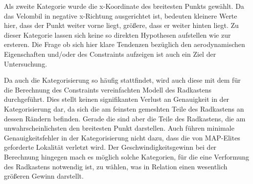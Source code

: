 Als zweite Kategorie wurde die x-Koordinate des breitesten Punkts gewählt.
Da das Velombil in negative x-Richtung ausgerichtet ist, bedeuten kleinere Werte hier, dass der Punkt weiter vorne liegt, größere, dass er weiter hinten liegt.
Zu dieser Kategorie lassen sich keine so direkten Hypothesen aufstellen wie zur ersteren.
Die Frage ob sich hier klare Tendenzen bezüglich den aerodynamischen Eigenschaften und/oder des Constraints aufzeigen ist auch ein Ziel der Untersuchung.

Da auch die Kategorisierung so häufig stattfindet, wird auch diese mit dem für die Berechnung des Constraints vereinfachten Modell des Radkastens durchgeführt. 
Dies stellt keinen signifikanten Verlust an Genauigkeit in der Kategorisierung dar, da sich die am feinsten gemeshten Teile des Radkastens an dessen Rändern befinden.
Gerade die sind aber die Teile des Radkastens, die am unwahrscheinlichsten den breitesten Punkt darstellen.
Auch führen minimale Genauigkeitsfehler in der Kategorisierung nicht dazu, dass die von MAP-Elites geforderte Lokalität verletzt wird.
Der Geschwindigkeitsgewinn bei der Berechnung hingegen mach es möglich solche Kategorien, für die eine Verformung des Radkastens notwendig ist, zu wählen, was in Relation einen wesentlich größeren Gewinn darstellt.

%
%





